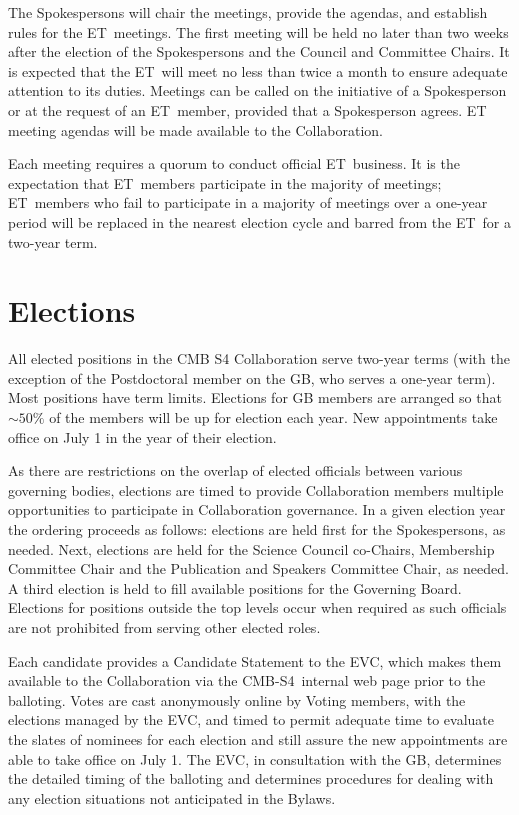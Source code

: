 \documentclass[12pt]{article}
\newcommand{\exec}{{Executive Team}}
\newcommand{\shorte}{{ET}}  %
\newcommand\collabname{CMB-S4}
\begin{document}
The Spokespersons will chair the meetings, provide the agendas, and establish rules for the \shorte\ meetings. The first meeting will be held no later than two weeks after the election of the Spokespersons and the Council and Committee Chairs. It is expected that the \shorte\ will meet no less than twice a month to ensure adequate attention to its duties. Meetings can be called on the initiative of a Spokesperson or at the request of an \shorte\ member, provided that a Spokesperson agrees. ET meeting agendas will be made available to the Collaboration.

Each meeting requires a quorum to conduct official \shorte\ business.  It is the expectation that \shorte\ members participate in the majority of meetings; \shorte\ members who fail to participate in a majority of meetings over a one-year period will be replaced in the nearest election cycle and barred from the \shorte\ for a two-year term.  

\section{Elections}\label{sec:elections}

All elected positions in the CMB S4 Collaboration serve two-year terms (with the exception of the Postdoctoral member on the GB, who serves a one-year term). Most positions have term limits.  Elections for GB members are  arranged so that $\sim 50\%$ of the members will be up for election each year. New appointments take office on July 1 in the year of their election.  

As there are restrictions on the overlap of elected officials between various governing bodies, elections are timed to provide Collaboration members multiple opportunities to participate in Collaboration governance. In a given election year the ordering proceeds as follows: elections are held first for the Spokespersons, as needed. Next, elections are held for the Science Council co-Chairs, Membership Committee Chair and the Publication and Speakers Committee Chair, as needed.  A third election is held to fill available positions for the Governing Board. Elections for positions outside the top levels occur when required as such officials are not prohibited from serving other elected roles. 

Each candidate provides a Candidate Statement to the EVC, which makes them available to the Collaboration via the \collabname\  internal web page prior to the balloting. Votes are cast anonymously online by Voting members, with the elections managed by the EVC, and timed to permit adequate time to evaluate the slates of nominees for each election and still assure the new appointments are able to take office on July 1.  The EVC, in consultation with the GB,  determines the detailed timing of the balloting and determines procedures for dealing with any election situations not anticipated in the Bylaws.
\end{document}
